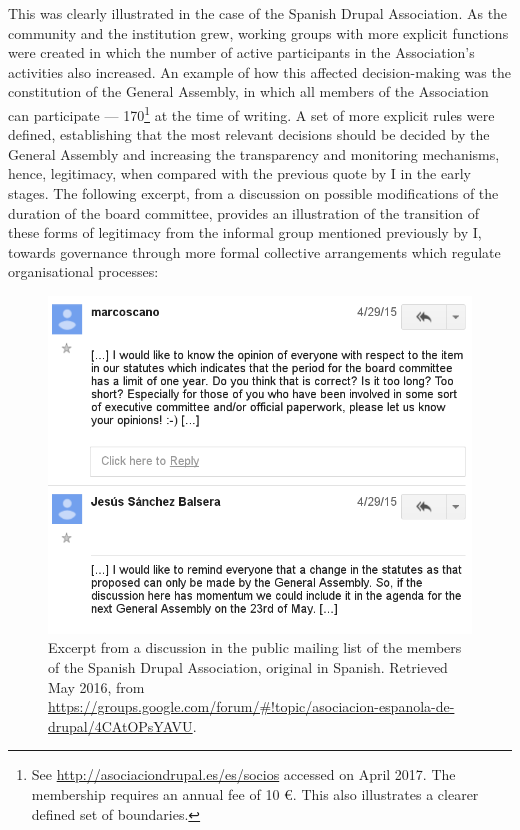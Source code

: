 This was clearly illustrated in the case of the Spanish Drupal Association. As the community and the institution grew, working groups with more explicit functions were created \parencite{aed-grupos-trabajo:2016:Online} in which the number of active participants in the Association's activities also increased. An example of how this affected decision-making was the constitution of the General Assembly, in which all members of the Association can participate --- 170\footnote{See \url{http://asociaciondrupal.es/es/socios} accessed on  April 2017. The membership requires an annual fee of 10 \euro{}. This also illustrates a clearer defined set of boundaries.} at the time of writing. A set of more explicit rules were defined, establishing that the most relevant decisions should be decided by the General Assembly and increasing the transparency and monitoring mechanisms, hence, legitimacy, when compared with the previous quote by I in the early stages. The following excerpt, from a discussion on possible modifications of the duration of the board committee, provides an illustration of the transition of these forms of legitimacy from the informal group mentioned previously by I, towards governance through more formal collective arrangements which regulate organisational processes:

\begin{figure}[H]
  \centering
\includegraphics[scale=0.45]{img/quotes_replacement/aed_quote_rules.png}
\caption[Excerpt from a discussion in the mailing list of the members of the Spanish Drupal Association]{Excerpt from a discussion in the public mailing list of the members of the Spanish Drupal Association, original in Spanish. Retrieved  May 2016, from \url{https://groups.google.com/forum/\#!topic/asociacion-espanola-de-drupal/4CAtOPsYAVU}.}
\label{quote_aed}
\end{figure}

